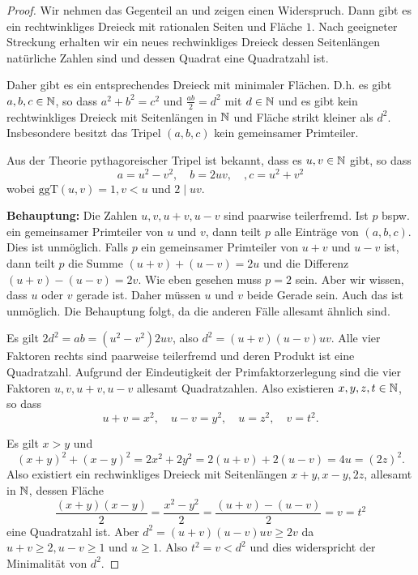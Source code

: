 \begin{proof}
  Wir nehmen das Gegenteil an und zeigen einen Widerspruch. Dann gibt
  es ein rechtwinkliges Dreieck mit rationalen Seiten und Fläche $1$.
  Nach geeigneter Streckung erhalten wir ein neues rechwinkliges Dreieck dessen
  Seitenlängen natürliche Zahlen sind und dessen Quadrat eine Quadratzahl
  ist.

  Daher gibt es  ein entsprechendes Dreieck
  mit minimaler Flächen. 
  D.h. es gibt $a,b,c\in{\mathbb{N}}$, so dass $a^2+b^2=c^2$ und $\frac{ab}{2}
  = d^2$ mit $d\in{\mathbb{N}}$ und es gibt kein rechtwinkliges Dreieck mit Seitenlängen in
  ${\mathbb{N}}$ und Fläche strikt kleiner als $d^2$.  Insbesondere besitzt das
  Tripel $(a,b,c)$ kein gemeinsamer Primteiler. 

  Aus der Theorie pythagoreischer Tripel ist  bekannt, dass es $u,v\in{\mathbb{N}}$ gibt, so dass
  \begin{equation*}
    a  = u^2-v^2, \quad b = 2uv, \quad, c=u^2+v^2
  \end{equation*}
  wobei $\mathrm{ggT}(u,v)=1, v<u$ und $2\mid uv$.

  \textbf{Behauptung:} Die Zahlen $u,v,u+v,u-v$ sind paarwise
  teilerfremd.
  Ist $p$ bspw. ein gemeinsamer Primteiler von $u$ und $v$, dann teilt
  $p$ alle Einträge von $(a,b,c)$. Dies ist unmöglich. Falls $p$
  ein gemeinsamer Primteiler von $u+v$ und $u-v$ ist, dann teilt $p$
  die Summe  $(u+v)+(u-v)=2u$ und die Differenz $(u+v)-(u-v) = 2v$.
  Wie eben gesehen muss $p=2$ sein. Aber wir wissen, dass $u$ oder $v$
  gerade ist.  Daher müssen $u$ und $v$ beide Gerade sein. Auch das
  ist unmöglich. Die  Behauptung folgt, da die anderen Fälle allesamt
  ähnlich sind. 

  Es gilt $2d^2 = ab = (u^2-v^2)2uv$, also $d^2 = (u+v)(u-v)uv$. Alle
  vier Faktoren rechts sind paarweise teilerfremd und deren Produkt
  ist eine Quadratzahl. Aufgrund der Eindeutigkeit der Primfaktorzerlegung
  sind die vier Faktoren $u,v,u+v,u-v$ allesamt Quadratzahlen. Also
  existieren $x,y,z,t\in{\mathbb{N}}$, so dass
  \begin{equation*}
    u+v = x^2, \quad u-v = y^2, \quad u=z^2, \quad v= t^2.
  \end{equation*}

  Es gilt $x>y$ und 
  $$(x+y)^2+(x-y)^2 = 2x^2+2y^2 = 2(u+v)+2(u-v) = 4u = (2z)^2.
  $$
  Also existiert ein rechwinkliges Dreieck mit Seitenlängen
  $x+y,x-y,2z$, allesamt in ${\mathbb{N}}$, dessen Fläche
  \begin{equation*}
    \frac{(x+y)(x-y)}{2} = \frac{x^2-y^2}{2} = \frac{(u+v)-(u-v)}{2} =
    v = t^2
  \end{equation*}
  eine Quadratzahl ist. 
  Aber $d^2 = (u+v)(u-v)uv\ge 2v$ da $u+v\ge 2,u-v\ge 1$ und $u\ge 1$.
  Also $t^2=v<d^2$ und dies widerspricht der Minimalität von $d^2$. 
\end{proof}

